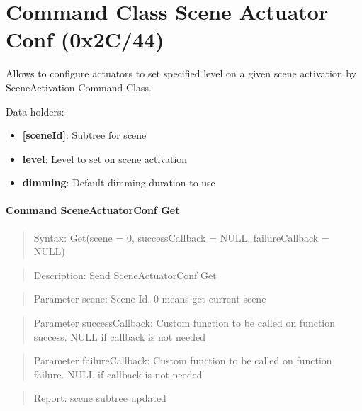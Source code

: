 \section{Command Class Scene Actuator Conf (0x2C/44)}

Allows to configure actuators to set specified level on a given scene activation by SceneActivation Command Class.
\newline

\noindent
Data holders:

\begin{itemize}
\item \textbf{[sceneId]}: Subtree for scene
\item \qquad\textbf{level}: Level to set on scene activation
\item \qquad\textbf{dimming}: Default dimming duration to use
\end{itemize}

\paragraph{Command SceneActuatorConf Get}
\begin{quote}Syntax: Get(scene = 0, successCallback = NULL, failureCallback = NULL)\end{quote}
\begin{quote}Description: Send SceneActuatorConf Get\end{quote}
\begin{quote}Parameter scene: Scene Id. 0 means get current scene\end{quote}
\begin{quote}Parameter successCallback: Custom function to be called on function success. NULL if callback is not needed\end{quote}
\begin{quote}Parameter failureCallback: Custom function to be called on function failure. NULL if callback is not needed\end{quote}
\begin{quote}Report: scene subtree updated\end{quote}

